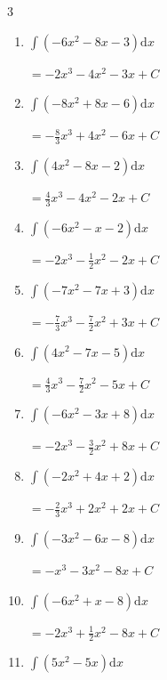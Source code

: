 \begin{multicols}{3}
\begin{enumerate}
  \item $\displaystyle \int \left( -6x^{2}-8x-3 \right) \mathrm{d}x$

        $\displaystyle =-2x^{3}-4x^{2}-3x+ C$

  \item $\displaystyle \int \left( -8x^{2}+8x-6 \right) \mathrm{d}x$

        $\displaystyle =-\frac{8}{3}x^{3}+4x^{2}-6x+ C$

\columnbreak %

\resetques

  \item $\displaystyle \int \left( 4x^{2}-8x-2 \right) \mathrm{d}x$

        $\displaystyle =\frac{4}{3}x^{3}-4x^{2}-2x+ C$

  \item $\displaystyle \int \left( -6x^{2}-x-2 \right) \mathrm{d}x$

        $\displaystyle =-2x^{3}-\frac{1}{2}x^{2}-2x+ C$

  \item $\displaystyle \int \left( -7x^{2}-7x+3 \right) \mathrm{d}x$

        $\displaystyle =-\frac{7}{3}x^{3}-\frac{7}{2}x^{2}+3x+ C$

  \item $\displaystyle \int \left( 4x^{2}-7x-5 \right) \mathrm{d}x$

        $\displaystyle =\frac{4}{3}x^{3}-\frac{7}{2}x^{2}-5x+ C$

  \item $\displaystyle \int \left( -6x^{2}-3x+8 \right) \mathrm{d}x$

        $\displaystyle =-2x^{3}-\frac{3}{2}x^{2}+8x+ C$

  \item $\displaystyle \int \left( -2x^{2}+4x+2 \right) \mathrm{d}x$

        $\displaystyle =-\frac{2}{3}x^{3}+2x^{2}+2x+ C$

  \item $\displaystyle \int \left( -3x^{2}-6x-8 \right) \mathrm{d}x$

        $\displaystyle =-x^{3}-3x^{2}-8x+ C$

  \item $\displaystyle \int \left( -6x^{2}+x-8 \right) \mathrm{d}x$

        $\displaystyle =-2x^{3}+\frac{1}{2}x^{2}-8x+ C$

  \item $\displaystyle \int \left( 5x^{2}-5x \right) \mathrm{d}x$


\end{enumerate}
\end{multicols}
